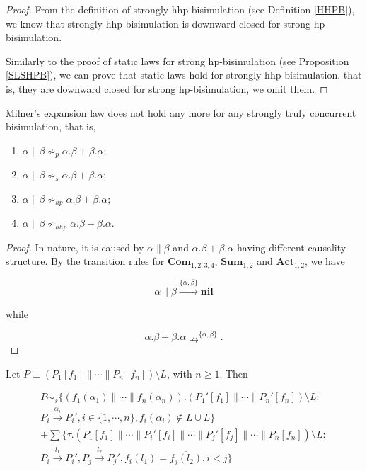 \begin{proof}
From the definition of strongly hhp-bisimulation (see Definition \ref{HHPB}), we know that strongly hhp-bisimulation is downward closed for strong hp-bisimulation.

Similarly to the proof of static laws for strong hp-bisimulation (see Proposition \ref{SLSHPB}), we can prove that static laws hold for strongly hhp-bisimulation, that is, they are downward closed for strong hp-bisimulation, we omit them.
\end{proof}

\begin{proposition}
Milner's expansion law does not hold any more for any strongly truly concurrent bisimulation, that is,

\begin{enumerate}
  \item $\alpha\parallel\beta\nsim_p \alpha.\beta+\beta.\alpha$;
  \item $\alpha\parallel\beta\nsim_s \alpha.\beta+\beta.\alpha$;
  \item $\alpha\parallel\beta\nsim_{hp} \alpha.\beta+\beta.\alpha$;
  \item $\alpha\parallel\beta\nsim_{hhp} \alpha.\beta+\beta.\alpha$.
\end{enumerate}
\end{proposition}

\begin{proof}
In nature, it is caused by $\alpha\parallel \beta$ and $\alpha.\beta + \beta.\alpha$ having different causality structure. By the transition rules for $\textbf{Com}_{1,2,3,4}$, $\textbf{Sum}_{1,2}$ and $\textbf{Act}_{1,2}$, we have

$$\alpha\parallel \beta\xrightarrow{\{\alpha,\beta\}}\textbf{nil}$$

while

$$\alpha.\beta+ \beta.\alpha\nrightarrow^{\{\alpha,\beta\}}.$$
\end{proof}

\begin{proposition}\label{NELSSB}
Let $P\equiv (P_1[f_1]\parallel\cdots\parallel P_n[f_n])\setminus L$, with $n\geq 1$. Then

\begin{eqnarray}
P\sim_s \{(f_1(\alpha_1)\parallel\cdots\parallel f_n(\alpha_n)).(P_1'[f_1]\parallel\cdots\parallel P_n'[f_n])\setminus L: \nonumber\\
P_i\xrightarrow{\alpha_i}P_i',i\in\{1,\cdots,n\},f_i(\alpha_i)\notin L\cup\overline{L}\} \nonumber\\
+\sum\{\tau.(P_1[f_1]\parallel\cdots\parallel P_i'[f_i]\parallel\cdots\parallel P_j'[f_j]\parallel\cdots\parallel P_n[f_n])\setminus L: \nonumber\\
P_i\xrightarrow{l_1}P_i',P_j\xrightarrow{l_2}P_j',f_i(l_1)=\overline{f_j(l_2)},i<j\} \nonumber
\end{eqnarray}
\end{proposition}

